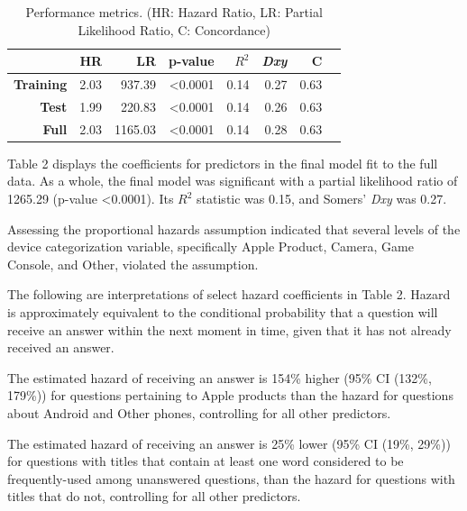 \documentclass[final]{beamer}
\newlength{\onecolwid}
\newlength{\twocolwid}
\begin{document}
\begin{frame}[t]
\begin{columns}[t]
\begin{column}{\twocolwid}
\begin{columns}[t,totalwidth=\twocolwid]
\begin{column}{\onecolwid}
\begin{block}
\end{block}


\begin{table}[!htbp]
\centering
\begin{tabular}{|r|r|r|r|r|r|r|r|}
  \hline
 & \textbf{HR} & \textbf{LR} & \textbf{p-value} & \textbf{$R^2$} & \textbf{\textit{Dxy}} & \textbf{C} \\ 
  \hline
  \textbf{Training} & 2.03 & 937.39  & \textless0.0001 & 0.14 & 0.27 & 0.63 \\ 
  \textbf{Test}     & 1.99 & 220.83  & \textless0.0001 & 0.14 & 0.26 & 0.63 \\
  \textbf{Full}     & 2.03 & 1165.03 & \textless0.0001 & 0.14 & 0.28 & 0.63 \\ 
   \hline
\end{tabular}
\caption{Performance metrics. (HR: Hazard Ratio, LR: Partial Likelihood Ratio, C: Concordance)} 
\label{table:1}
\end{table}

\begin{block}

Table 2 displays the coefficients for predictors in the final model fit to the full data. As a whole, the final model was significant with a partial likelihood ratio of 1265.29 (p-value \textless0.0001). Its $R^2$ statistic was 0.15, and Somers' \textit{Dxy} was 0.27. 

Assessing the proportional hazards assumption indicated that several levels of the device categorization variable, specifically Apple Product, Camera, Game Console, and Other, violated the assumption. 

The following are interpretations of select hazard coefficients in Table 2. Hazard is approximately equivalent to the conditional probability that a question will receive an answer within the next moment in time, given that it has not already received an answer. 

\textcolor{dblue!70}{} The estimated hazard of receiving an answer is 154\% higher (95\% CI (132\%, 179\%)) for questions pertaining to Apple products than the hazard for questions about Android and Other phones, controlling for all other predictors.

\textcolor{dblue!70}{} The estimated hazard of receiving an answer is 25\% lower (95\% CI (19\%, 29\%)) for questions with titles that contain at least one word considered to be frequently-used among unanswered questions, than the hazard for questions with titles that do not, controlling for all other predictors. 



\end{block}
\end{column}
\end{columns}
\end{column}
\end{columns}
\end{frame}
\end{document}

